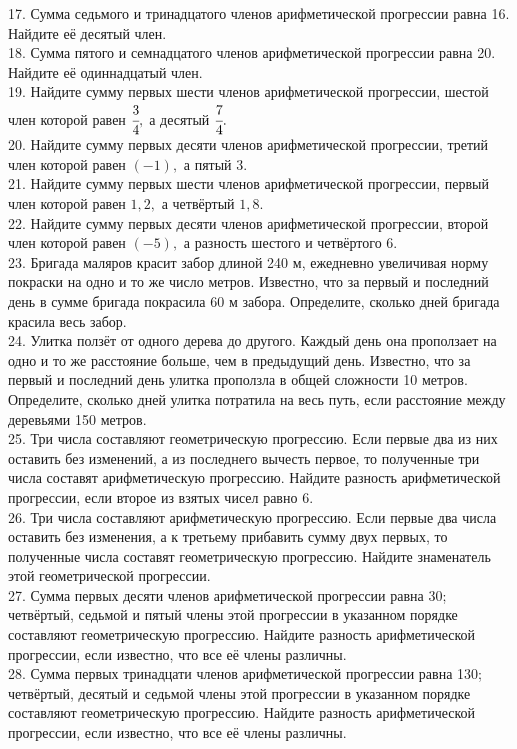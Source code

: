 \documentclass[12pt]{article}
\begin{document}
17. Сумма седьмого и тринадцатого членов арифметической прогрессии равна 16. Найдите её десятый член.\\
18. Сумма пятого и семнадцатого членов арифметической прогрессии равна 20. Найдите её одиннадцатый член.\\
19. Найдите сумму первых шести членов арифметической прогрессии, шестой член которой равен $\cfrac{3}{4},$ а десятый $\cfrac{7}{4}.$\\
20. Найдите сумму первых десяти членов арифметической прогрессии, третий член которой равен $(-1),$ а пятый $3.$\\
21. Найдите сумму первых шести членов арифметической прогрессии, первый член которой равен $1,2,$ а четвёртый $1,8.$\\
22. Найдите сумму первых десяти членов арифметической прогрессии, второй член которой равен $(-5),$ а разность шестого и четвёртого $6.$\\
23. Бригада маляров красит забор длиной 240 м, ежедневно увеличивая норму покраски на одно и то же число метров. Известно, что за первый и последний день в сумме бригада покрасила 60 м забора. Определите, сколько дней бригада красила весь забор.\\
24. Улитка ползёт от одного дерева до другого. Каждый день она проползает на одно и то же расстояние больше, чем в предыдущий день. Известно, что за первый и последний день улитка проползла в общей сложности 10 метров. Определите, сколько дней улитка потратила на весь путь, если расстояние между деревьями 150 метров.\\
25. Три числа составляют геометрическую прогрессию. Если первые два из них оставить без изменений, а из последнего вычесть первое, то полученные три числа составят арифметическую прогрессию. Найдите разность арифметической прогрессии, если второе из взятых чисел равно 6.\\
26. Три числа составляют арифметическую прогрессию. Если первые два числа оставить без изменения, а к третьему прибавить сумму двух первых, то полученные числа составят геометрическую прогрессию. Найдите знаменатель этой геометрической прогрессии.\\
27. Сумма первых десяти членов арифметической прогрессии равна 30; четвёртый, седьмой и пятый члены этой прогрессии в указанном порядке составляют геометрическую прогрессию. Найдите разность арифметической прогрессии, если известно, что все её члены различны.\\
28. Сумма первых тринадцати членов арифметической прогрессии равна 130; четвёртый, десятый и седьмой члены этой прогрессии в указанном порядке составляют геометрическую прогрессию. Найдите разность арифметической прогрессии, если известно, что все её члены различны.\\
\end{document}
